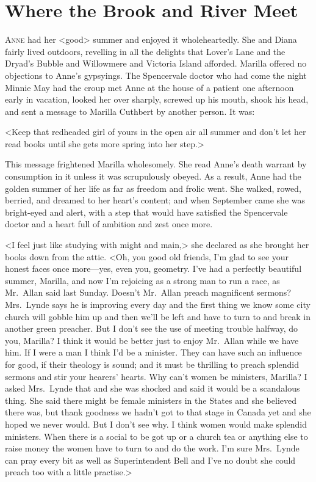\chapter{Where the Brook and River Meet}

\lettrine{A}{nne} had her <good> summer and enjoyed it wholeheartedly. She and Diana fairly lived outdoors, revelling in all the delights that Lover's Lane and the Dryad's Bubble and Willowmere and Victoria Island afforded. Marilla offered no objections to Anne's gypsyings. The Spencervale doctor who had come the night Minnie May had the croup met Anne at the house of a patient one afternoon early in vacation, looked her over sharply, screwed up his mouth, shook his head, and sent a message to Marilla Cuthbert by another person. It was:

<Keep that redheaded girl of yours in the open air all summer and don't let her read books until she gets more spring into her step.>

This message frightened Marilla wholesomely. She read Anne's death warrant by consumption in it unless it was scrupulously obeyed. As a result, Anne had the golden summer of her life as far as freedom and frolic went. She walked, rowed, berried, and dreamed to her heart's content; and when September came she was bright-eyed and alert, with a step that would have satisfied the Spencervale doctor and a heart full of ambition and zest once more.

<I feel just like studying with might and main,> she declared as she brought her books down from the attic. <Oh, you good old friends, I'm glad to see your honest faces once more—yes, even you, geometry. I've had a perfectly beautiful summer, Marilla, and now I'm rejoicing as a strong man to run a race, as Mr.~Allan said last Sunday. Doesn't Mr.~Allan preach magnificent sermons? Mrs.~Lynde says he is improving every day and the first thing we know some city church will gobble him up and then we'll be left and have to turn to and break in another green preacher. But I don't see the use of meeting trouble halfway, do you, Marilla? I think it would be better just to enjoy Mr.~Allan while we have him. If I were a man I think I'd be a minister. They can have such an influence for good, if their theology is sound; and it must be thrilling to preach splendid sermons and stir your hearers' hearts. Why can't women be ministers, Marilla? I asked Mrs.~Lynde that and she was shocked and said it would be a scandalous thing. She said there might be female ministers in the States and she believed there was, but thank goodness we hadn't got to that stage in Canada yet and she hoped we never would. But I don't see why. I think women would make splendid ministers. When there is a social to be got up or a church tea or anything else to raise money the women have to turn to and do the work. I'm sure Mrs.~Lynde can pray every bit as well as Superintendent Bell and I've no doubt she could preach too with a little practise.>

